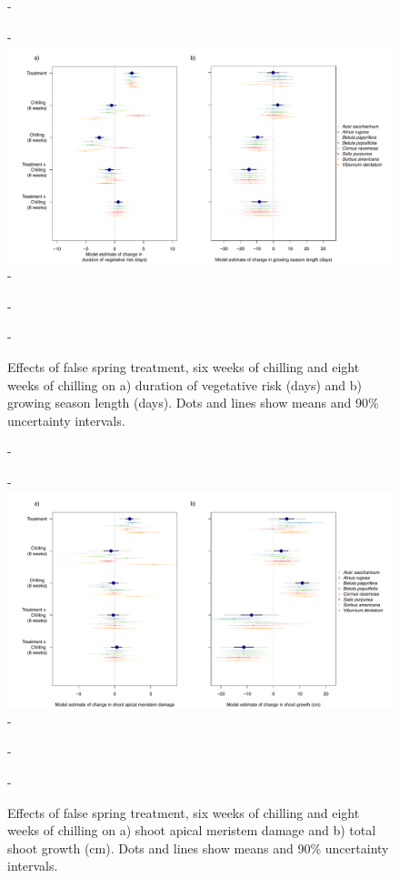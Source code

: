 \documentclass{article}\usepackage[]{graphicx}\usepackage[]{color}
\begin{document}
  {\begin{figure} [H]
  -\begin{center}
  -\includegraphics[width=18cm]{..//analyses/figures/mu_phen.pdf} 
  -\caption{Effects of false spring treatment, six weeks of chilling and eight weeks of chilling on a) duration of vegetative risk (days) and b) growing season length (days). Dots and lines show means and 90\% uncertainty intervals.}\label{fig:muphen}
  -\end{center}
  -\end{figure}}
  
  {\begin{figure} [H]
  -\begin{center}
  -\includegraphics[width=18cm]{..//analyses/figures/mu_growth.pdf} 
  -\caption{Effects of false spring treatment, six weeks of chilling and eight weeks of chilling on a) shoot apical meristem damage and b) total shoot growth (cm). Dots and lines show means and 90\% uncertainty intervals. }\label{fig:mugrowth}
  -\end{center}
  -\end{figure}}
  
\end{document}
